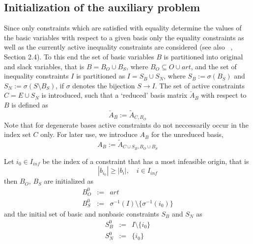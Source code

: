 \documentclass[a4paper]{article}
\begin{document}
\subsection{Initialization of the auxiliary problem}
Since only constraints which are satisfied with equality determine the values of
the basic variables with respect to a given basis only the equality constraints
as well as the currently active inequality constraints are
considered (see also ~\cite{Sven}, Section 2.4).
To this end the set of basic variables $B$ is partitioned into original and
slack variables, that is
$B=B_{O} \cup B_{S}$, where $B_O \subseteq O \cup art$,
and the set of inequality constraints $I$ is partitioned as
$I=S_{B} \cup S_{N}$, where $S_{B}:=\sigma(B_{S})$
and
$S_{N}:=\sigma(S \setminus B_{S})$, if $\sigma$ denotes the bijection
$S \rightarrow I$.
The set of active constraints
$C=E \cup S_{N}$ is
introduced, such that a `reduced' basis matrix $\check{A}_{B}$
with respect to $B$ is defined as
\begin{equation}
\label{def:red_basis_phaseI}
 \check{A}_{B}:=\tilde{A}_{C, B_{O}}
\end{equation}
Note that for degenerate bases active constraints do not neccessarily occur in
the index set $C$ only.
For later use, we introduce $A_{B}$ for the unreduced basis,
\begin{equation}
\label{def:basis_phaseI}
  A_{B}:= \tilde{A}_{C \cup S_{B}, B_{O} \cup B_{S}}
\end{equation}

Let $i_{0} \in I_{inf}$ be the index of a constraint that has a most infeasible
origin, that is 
\[
  \left| b_{i_{0}} \right| \geq  \left|b_{i}\right|, \quad i \in I_{inf}
\]
then $B_{O}$, $B_{S}$ are initialized
as
\begin{eqnarray}
  \label{def:B_O_init}
  B_{O}^{0} & := & art  \\
  \label{def:B_S_init}
  B_{S}^{0} & := & \sigma^{-1} \left( I \right)  \setminus
  \{ \sigma^{-1} \left( i_{0} \right) \}
\end{eqnarray}
and the initial set of basic and nonbasic constraints $S_{B}$ and $S_{N}$ as
\begin{eqnarray}
  \label{def:S_B_init}
  S_{B}^{0} & := & I \setminus \{ i_{0}  \} \\
  \label{def:S_N_init}
  S_{N}^{0} & := & \{ i_{0} \} 
\end{eqnarray}
\end{document}
